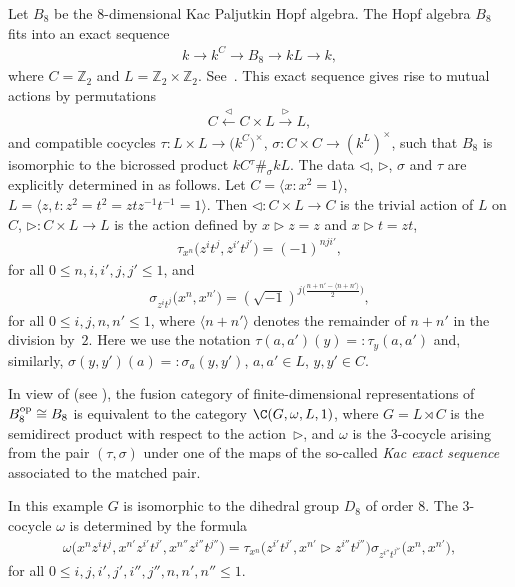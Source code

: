 \begin{Example}\label{kp}
Let $B_8$ be the 8-dimensional Kac Paljutkin Hopf algebra. The Hopf algebra $B_8$ f\/its into an exact sequence
\begin{gather*}
k \longrightarrow k^C \longrightarrow B_8 \longrightarrow kL \longrightarrow k,
\end{gather*}
where $C = \mathbb Z_2$ and $L = \mathbb Z_2 \times \mathbb Z_2$. See~\cite{masuoka-6-8}. This exact sequence gives rise to mutual actions by permutations
\begin{gather*}C \overset{\vartriangleleft}\longleftarrow C \times L
\overset{\vartriangleright}\longrightarrow L,\end{gather*}
and compatible cocycles $\tau\colon L \times L \to \big(k^C\big)^\times$, $\sigma\colon C \times C \to (k^L)^\times$, such that $B_8$ is isomorphic to the bicrossed product $kC {}^{\tau}\#_\sigma kL$. The data $\lhd$, $\rhd$, $\sigma$ and $\tau$ are explicitly determined in \cite[Proposition~3.11]{ma-contemp} as follows. Let $C = \langle x\colon x^2 = 1 \rangle$, $L = \langle z, t\colon z^2 = t^2 = ztz^{-1}t^{-1} = 1\rangle$. Then $\lhd\colon C\times L \to C$ is the trivial action of $L$ on $C$, $\rhd\colon C \times L \to L$ is the action def\/ined by $x \rhd z = z$ and $x\rhd t = zt$,
\begin{gather*}\tau_{x^n}\big(z^it^j, z^{i'}t^{j'}\big) = (-1)^{nji'},\end{gather*} for all $0\leq n, i, i', j, j' \leq 1$,
and
\begin{gather*}\sigma_{z^it^j}\big(x^n, x^{n'}\big) = (\sqrt{-1})^{j\big(\frac{n+n'-\langle n+n'\rangle}{2}\big)},\end{gather*}
for all $0 \leq i, j, n, n' \leq 1$, where $\langle n+n'\rangle$ denotes the remainder of $n+n'$ in the division by~$2$. Here we use the notation $\tau(a, a')(y) = : \tau_y(a, a')$ and, similarly, $\sigma(y, y')(a) = : \sigma_a(y, y')$, $a, a' \in L$, $y, y' \in C$.

In view of \cite[Theorem~3.3.5]{schauenburg} (see \cite[Proposition~4.3]{gttic}), the fusion category of f\/inite-dimen\-sio\-nal representations of $B_8^{\rm op} \cong B_8$ is equivalent to the category $\C(G, \omega, L, 1)$, where $G = L \rtimes C$ is the semidirect product with respect to the action~$\rhd$, and $\omega$ is the 3-cocycle arising from the pair $(\tau, \sigma)$ under one of the maps of the so-called \emph{Kac exact sequence} associated to the matched pair.

In this example $G$ is isomorphic to the dihedral group $D_8$ of order 8. The 3-cocycle $\omega$ is determined by the formula
\begin{gather}\label{kac}\omega\big(x^{n}z^{i}t^{j}, x^{n'}z^{i'}t^{j'}, x^{n''}z^{i''}t^{j''}\big) =
\tau_{x^n}\big(z^{i'}t^{j'}, x^{n'} \rhd z^{i''}t^{j''}\big) \sigma_{z^{i''}t^{j''}}\big(x^n, x^{n'}\big),\end{gather}
for all $0 \leq i, j, i', j', i'', j'', n, n', n'' \leq 1$.


\end{Example}
